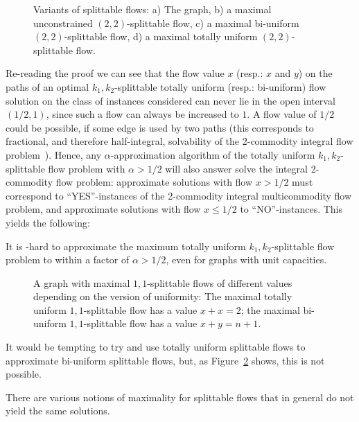 \begin{figure}
  \centering

  \caption{Variants of splittable flows: a) The graph, b) a maximal unconstrained $(2,2)$-splittable flow, c) a maximal bi-uniform $(2,2)$-splittable flow, d) a maximal totally uniform $(2,2)$-splittable flow.}
  \label{fig:intro}
\end{figure}
Re-reading the proof we can see that the flow value $x$ (resp.: $x$
and $y$) on the paths
of an optimal $k_1,k_2$-splittable totally uniform (resp.: bi-uniform) flow
solution on the class of instances considered can never lie in the
open interval $(1/2,1)$, since such a flow can always be increased to
$1$. A flow value of $1/2$ could be possible, if some edge is used by
two paths (this corresponds to fractional, and therefore
half-integral, solvability of the 2-commodity integral flow
problem~\cite{hu:63}). Hence, any $\alpha$-approximation algorithm of
the totally uniform $k_1,k_2$-splittable flow problem with
$\alpha>1/2$ will also answer solve the integral 2-commodity flow
problem: approximate solutions with flow $x>1/2$ must correspond to
``YES''-instances of the 2-commodity integral multicommodity flow
problem, and approximate solutions with flow $x\leq 1/2$ to
``NO''-instances.  This yields the following:

\begin{corollary}\label{lem:0.5-hardness}
  It is \NP-hard to approximate the maximum totally uniform
  $k_1,k_2$-splittable flow problem  to within a
  factor of $\alpha>1/2$, even for graphs with unit capacities.
\end{corollary}

\begin{figure}
  \centering
  \caption{A graph with maximal $1,1$-splittable flows of different
    values depending on the version of uniformity: The  maximal totally uniform $1,1$-splittable flow has a value
$x+x = 2$; the maximal bi-uniform $1,1$-splittable flow has a value 
$x+y = n+1$.}
  \label{fig:uniformity-example}
\end{figure}
It would be tempting to try and use totally uniform splittable flows
to approximate bi-uniform splittable flows, but, as
Figure~\ref{fig:uniformity-example} shows, this is not possible.

\medskip

There are various notions of maximality for splittable flows that
in general do not yield the same solutions.

